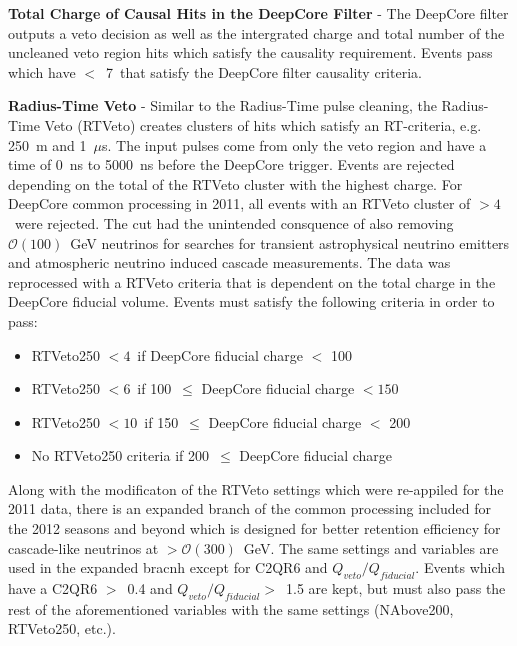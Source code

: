 \documentclass[../Main.tex]{subfiles}
\begin{document}

\textbf{Total Charge of Causal Hits in the DeepCore Filter} - The
DeepCore filter outputs a veto decision as well as the intergrated
charge and total number of the uncleaned veto region hits which satisfy the
causality requirement.  Events pass which have $<$~7~\pe that
satisfy the DeepCore filter causality criteria. 

\textbf{Radius-Time Veto} - Similar to the Radius-Time pulse cleaning,
the Radius-Time Veto (RTVeto) creates clusters of hits which satisfy
an RT-criteria, e.g. 250~m and 1~$\mu$s. The input pulses come from only
the veto region and have a time of 0~ns to 5000~ns before the DeepCore
trigger. Events are rejected depending on the total \pe of
the RTVeto cluster with the highest charge. For DeepCore common
processing in 2011, all events with an RTVeto cluster of $>4$~\pe were
rejected. The cut had the unintended consquence of also removing
$\mathcal{O}(100)$~GeV neutrinos for searches for transient astrophysical neutrino
emitters and atmospheric neutrino induced cascade measurements. The data
was reprocessed with a RTVeto criteria that is dependent on the total
charge in the DeepCore fiducial volume. Events must satisfy the
following criteria in order to pass:
\begin{itemize}
\item{ RTVeto250 $< 4$~\pe if DeepCore fiducial charge $<$ 100~\pe}
\item{ RTVeto250 $< 6$~\pe if 100~\pe $\leq$ DeepCore fiducial charge $<
    150$~\pe}
\item{ RTVeto250 $< 10$~\pe if 150~\pe $\leq$ DeepCore fiducial charge $<$
    200~\pe}
\item{ No RTVeto250 criteria if 200~\pe $\leq$ DeepCore fiducial charge}
\end{itemize}

Along with the modificaton of the RTVeto settings which were
re-appiled for the 2011 data, there is an
expanded branch of the common processing included for the 2012
seasons and beyond which is designed for better retention efficiency for cascade-like
neutrinos at $>\mathcal{O}(300)$~GeV. The same settings and variables
are used in the expanded bracnh except for C2QR6 and $Q_{veto}/Q_{fiducial}$. Events which
have a C2QR6 $>$~0.4 and $Q_{veto}/Q_{fiducial} >$~1.5 are kept, but
must also pass the rest of the aforementioned variables with the same
settings (NAbove200, RTVeto250, etc.).
\end{document}
